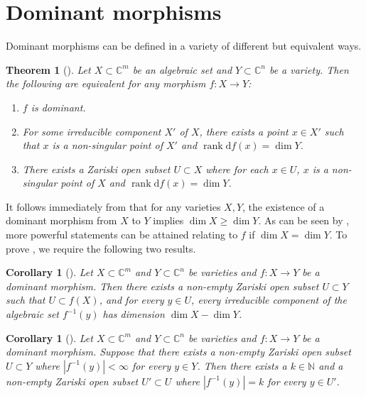 \documentclass[11pt]{article}
\newtheorem{corollary}[theo]{Corollary}
\newtheorem{theorem}[theo]{Theorem}
\theoremstyle{definition}
\numberwithin{equation}{section}
\DeclareMathOperator{\rank}{rank}
\newcommand{\diff}{\mathrm{d}}
\begin{document}
\appendix

\section{Dominant morphisms}
\label{sec:dom}

Dominant morphisms can be defined in a variety of different but equivalent ways.

\begin{theorem}[{\cite[Section AG, Theorem 17.3]{borel91}}]\label{borel91}
	Let $X \subset \mathbb{C}^m$ be an algebraic set and $Y \subset \mathbb{C}^n$ be a variety.
	Then the following are equivalent for any morphism $f :X \rightarrow Y$:
	\begin{enumerate}
		\item $f$ is dominant.
		\item For some irreducible component $X'$ of $X$, there exists a point $x \in X'$ such that $x$ is a non-singular point of $X'$ and $\rank \diff f(x) = \dim Y$.
		\item There exists a Zariski open subset $U \subset X$ where for each $x \in U$, $x$ is a non-singular point of $X$ and $\rank \diff f(x) = \dim Y$.
	\end{enumerate}
\end{theorem}

It follows immediately from  that for any varieties $X,Y$,
the existence of a dominant morphism from $X$ to $Y$ implies $\dim X \geq \dim Y$.
As can be seen by ,
more powerful statements can be attained relating to $f$ if $\dim X=\dim Y$.
To prove , we require the following two results.

\begin{corollary}[{\cite[Section 8, Corollary 1]{mumford}}]\label{mumford}
	Let $X \subset \mathbb{C}^m$ and $Y \subset \mathbb{C}^n$ be varieties and $f:X \rightarrow Y$ be a dominant morphism.
	Then there exists a non-empty Zariski open subset $U \subset Y$ such that $U \subset f(X)$, and for every $y \in U$, every irreducible component of the algebraic set $f^{-1}(y)$ has dimension $\dim X - \dim Y$.
\end{corollary}

\begin{corollary}[{\cite[Proposition 7.16]{Harris}}]\label{c:harris}
	Let $X \subset \mathbb{C}^m$ and $Y \subset \mathbb{C}^n$ be varieties and $f:X \rightarrow Y$ be a dominant morphism.
	Suppose that there exists a non-empty Zariski open subset $U \subset Y$ where $|f^{-1}(y)|<\infty$ for every $y \in Y$.
	Then there exists a $k \in \mathbb{N}$ and a non-empty Zariski open subset $U' \subset U$ where $|f^{-1}(y)| = k$ for every $y \in U'$.
\end{corollary}
\end{document}
